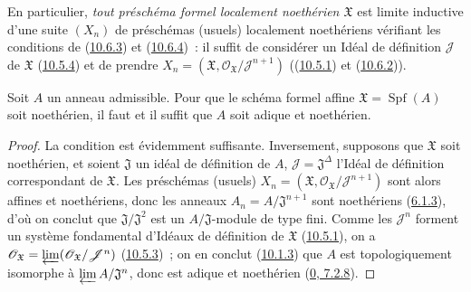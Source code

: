 En particulier, \emph{tout préschéma formel localement noethérien
$\mathfrak{X}$} est limite inductive d'une suite $(X_n)$ de préschémas
(usuels) localement noethériens vérifiant les conditions de
(\hyperref[I.10.6.3-fr]{10.6.3}) et
(\hyperref[I.10.6.4-fr]{10.6.4})~: il suffit de considérer un Idéal de
définition $\mathscr{J}$ de $\mathfrak{X}$
(\hyperref[I.10.5.4-fr]{10.5.4}) et de prendre
$X_n=(\mathfrak{X},
\mathscr{O}_{\mathfrak{X}}/\mathscr{J}^{n+1})$
((\hyperref[I.10.5.1-fr]{10.5.1}) et
(\hyperref[I.10.6.2-fr]{10.6.2})).

\begin{corollary}[10.6.5]
\label{I.10.6.5-fr}
Soit $A$ un anneau admissible. Pour que le schéma formel affine
$\mathfrak{X}=\operatorname{Spf}(A)$ soit noethérien, il faut et il
suffit que $A$ soit adique et noethérien.
\end{corollary}

\begin{proof}
La condition est évidemment suffisante. Inversement, supposons que
$\mathfrak{X}$ soit noethérien, et soient $\mathfrak{J}$ un idéal de
définition de $A$, $\mathscr{J}=\mathfrak{J}^\Delta$ l'Idéal de
définition correspondant de $\mathfrak{X}$. Les préschémas (usuels)
$X_n=(\mathfrak{X},
\mathscr{O}_{\mathfrak{X}}/\mathscr{J}^{n+1})$ sont alors affines et
noethériens, donc les anneaux
$A_n=A/\mathfrak{J}^{n+1}$ sont noethériens
(\hyperref[I.6.1.3-fr]{6.1.3}), d'où on conclut que
$\mathfrak{J}/\mathfrak{J}^2$ est un $A/\mathfrak{J}$-module de type
fini. Comme les $\mathscr{J}^n$ forment un système fondamental d'Idéaux
de définition de $\mathfrak{X}$
(\hyperref[I.10.5.1-fr]{10.5.1}), on a
$\mathscr{O}_{\mathfrak{X}}
=\varprojlim(\mathscr{O}_{\mathfrak{X}}/\mathscr{J}^n)$
(\hyperref[I.10.5.3-fr]{10.5.3})~; on en conclut
(\hyperref[I.10.1.3-fr]{10.1.3}) que $A$ est topologiquement isomorphe à
$\varprojlim A/\mathfrak{J}^n$, donc est adique et noethérien
(\hyperref[0.7.2.8-fr]{0, 7.2.8}).
\end{proof}

